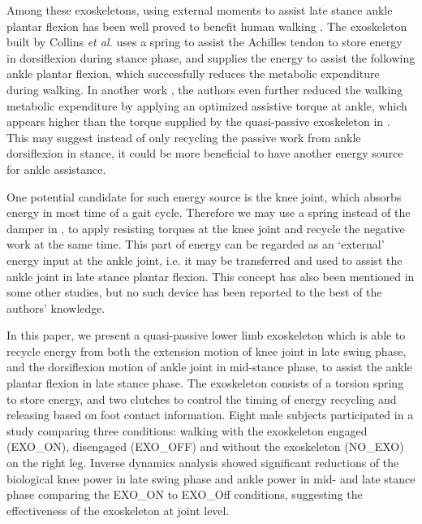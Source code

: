 \documentclass[twocolumn,cleanfoot,10pt]{asme2ej}
\begin{document}
Among these exoskeletons, using external moments to assist late stance ankle plantar flexion has been well proved to benefit human walking \cite{RN5,RN9,RN10,RN11,RN12}.
The exoskeleton built by Collins \emph{et al.}\cite{RN5} uses a spring to assist the Achilles tendon to store energy in dorsiflexion during stance phase, and supplies the energy to assist the following ankle plantar flexion, which successfully reduces the metabolic expenditure during walking.
In another work \cite{zhang2017human}, the authors even further reduced the walking metabolic expenditure by applying an optimized assistive torque at ankle, which appears higher than the torque supplied by the quasi-passive exoskeleton in \cite{RN5}.
This may suggest instead of only recycling the passive work from ankle dorsiflexion in stance, it could be more beneficial to have another energy source for ankle assistance.

One potential candidate for such energy source is the knee joint, which absorbs energy in most time of a gait cycle\cite{RN2}.
Therefore we may use a spring instead of the damper in \cite{RN3}, to apply resisting torques at the knee joint and recycle the negative work at the same time.
This part of energy can be regarded as an ‘external’ energy input at the ankle joint, i.e. it may be transferred and used to assist the ankle joint in late stance plantar flexion.
This concept has also been mentioned in some other studies\cite{RN3,RN12}, but no such device has been reported to the best of the authors' knowledge.

In this paper, we present a quasi-passive lower limb exoskeleton which is able to recycle energy from both the extension motion of knee joint in late swing phase, and the dorsiflexion motion of ankle joint in mid-stance phase, to assist the ankle plantar flexion in late stance phase.
The exoskeleton consists of a torsion spring to store energy, and two clutches to control the timing of energy recycling and releasing based on foot contact information.
Eight male subjects participated in a study comparing three conditions: walking with the exoskeleton engaged (EXO\_ON), disengaged (EXO\_OFF) and without the exoskeleton (NO\_EXO) on the right leg.
Inverse dynamics analysis showed significant reductions of the biological knee power in late swing phase and ankle power in mid- and late stance phase comparing the EXO\_ON to EXO\_Off conditions, suggesting the effectiveness of the exoskeleton at joint level.
\end{document}
